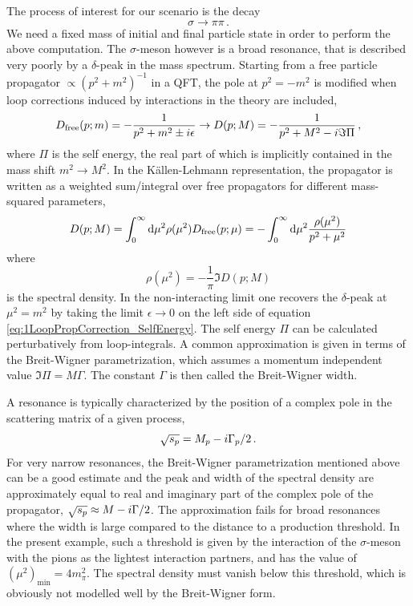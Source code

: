 The process of interest for our scenario is the decay
\begin{equation}
    \sigma\to\pi\pi\,.
\end{equation}
We need a fixed mass of initial and final particle state in order to perform the above computation. The $\sigma$-meson however is a broad resonance, that is described very poorly by a $\delta$-peak in the mass spectrum. Starting from a free particle propagator ${\propto(p^2+m^2)^{-1}}$ in a QFT, the pole at ${p^2=-m^2}$ is modified when loop corrections induced by interactions in the theory are included,
\begin{equation}
    D_{\text{free}}(p;m)=-\frac{1}{p^2+m^2\pm{i}\epsilon}\to D(p;M)=-\frac{1}{p^2+M^2-{i}\Im\Pi}\,,
    \label{eq:1LoopPropCorrection_SelfEnergy}
\end{equation}
where $\Pi$ is the self energy, the real part of which is implicitly contained in the mass shift ${m^2\to M^2}$. In the Källen-Lehmann representation, the propagator is written as a weighted sum/integral over free propagators for different mass-squared parameters,
\begin{equation}
    D(p;M)=\int_0^\infty\text{d}\mu^2\rho(\mu^2)D_{\text{free}}(p;\mu)=-\int_0^\infty\text{d}\mu^2\frac{\rho(\mu^2)}{p^2+\mu^2}
\end{equation}
where
\begin{equation}
    \rho(\mu^2)=-\frac{1}{\pi}\Im D(p;M)
\end{equation}
is the spectral density. In the non-interacting limit one recovers the $\delta$-peak at ${\mu^2=m^2}$ by taking the limit ${\epsilon\to 0}$ on the left side of equation \eqref{eq:1LoopPropCorrection_SelfEnergy}. The self energy $\Pi$ can be calculated perturbatively from loop-integrals. A common approximation is given in terms of the Breit-Wigner parametrization, which assumes a momentum independent value ${\Im\Pi=M\Gamma}$. The constant $\Gamma$ is then called the Breit-Wigner width.

A resonance is typically characterized by the position of a complex pole in the scattering matrix of a given process,
\begin{equation}
    \sqrt{s_p}=M_p-{i}\Gamma_p/2\,.
\end{equation}
For very narrow resonances, the Breit-Wigner parametrization mentioned above can be a good estimate and the peak and width of the spectral density are approximately equal to real and imaginary part of the complex pole of the propagator, ${\sqrt{s_p}\approx M-{i}\Gamma/2}$. The approximation fails for broad resonances where the width is large compared to the distance to a production threshold. In the present example, such a threshold is given by the interaction of the $\sigma$-meson with the pions as the lightest interaction partners, and has the value of ${(\mu^2)_{\text{min}}=4m_\pi^2}$. The spectral density must vanish below this threshold, which is obviously not modelled well by the Breit-Wigner form.


